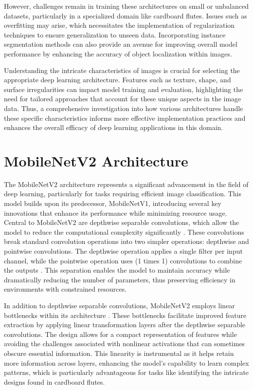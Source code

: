 However, challenges remain in training these architectures on small or unbalanced datasets, particularly in a specialized domain like cardboard flutes. Issues such as overfitting may arise, which necessitates the implementation of regularization techniques to ensure generalization to unseen data. Incorporating instance segmentation methods can also provide an avenue for improving overall model performance by enhancing the accuracy of object localization within images.


Understanding the intricate characteristics of images is crucial for selecting the appropriate deep learning architecture. Features such as texture, shape, and surface irregularities can impact model training and evaluation, highlighting the need for tailored approaches that account for these unique aspects in the image data. Thus, a comprehensive investigation into how various architectures handle these specific characteristics informs more effective implementation practices and enhances the overall efficacy of deep learning applications in this domain.

\section{MobileNetV2 Architecture}

The MobileNetV2 architecture represents a significant advancement in the field of deep learning, particularly for tasks requiring efficient image classification. This model builds upon its predecessor, MobileNetV1, introducing several key innovations that enhance its performance while minimizing resource usage. Central to MobileNetV2 are depthwise separable convolutions, which allow the model to reduce the computational complexity significantly \cite{Sandler2018}. These convolutions break standard convolution operations into two simpler operations: depthwise and pointwise convolutions. The depthwise operation applies a single filter per input channel, while the pointwise operation uses (1 times 1) convolutions to combine the outputs \cite{howard2017mobilenets}. This separation enables the model to maintain accuracy while dramatically reducing the number of parameters, thus preserving efficiency in environments with constrained resources.


In addition to depthwise separable convolutions, MobileNetV2 employs linear bottlenecks within its architecture \cite{Simonyan2015}. These bottlenecks facilitate improved feature extraction by applying linear transformation layers after the depthwise separable convolutions. The design allows for a compact representation of features while avoiding the challenges associated with nonlinear activations that can sometimes obscure essential information. This linearity is instrumental as it helps retain more information across layers, enhancing the model's capability to learn complex patterns, which is particularly advantageous for tasks like identifying the intricate designs found in cardboard flutes.



